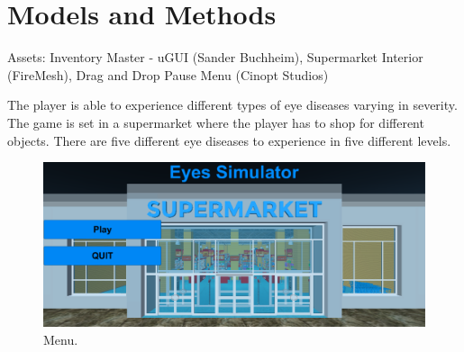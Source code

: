 \documentclass{acm_proc_article-sp}
\begin{document}
\section{Models and Methods}

Assets: Inventory Master - uGUI (Sander Buchheim), Supermarket Interior (FireMesh), Drag and Drop Pause Menu (Cinopt Studios)

The player is able to experience different types of eye diseases varying in severity.
%
%
The game is set in a supermarket where the player has to shop for different objects.
There are five different eye diseases to experience in five different levels.

\begin{figure}
    \centering
    \includegraphics[width=\columnwidth]{menu.png}
    \caption{Menu.}
    \label{fig:menu}
\end{figure}
\end{document}
